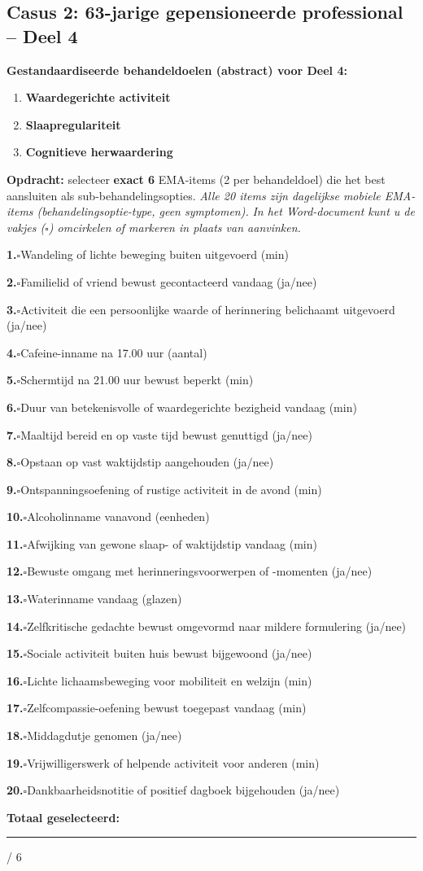 \documentclass[11pt,a4paper]{article}
\newcommand{\checkitemBFS}[2]{%
\noindent\small\textbf{#1.}\hspace{0.45em}$\square$\hspace{0.4em}#2\par\vspace{0.20em}}
\begin{document}
\vspace{0.6em}
\newpage
\subsection*{Casus 2: 63-jarige gepensioneerde professional -- Deel 4}

\begin{contextbox}
\small\textbf{Gestandaardiseerde behandeldoelen (abstract) voor Deel 4:}
\begin{enumerate}[topsep=2pt,itemsep=1pt,label=\arabic*.]
\item \textbf{Waardegerichte activiteit}
\item \textbf{Slaapregulariteit}
\item \textbf{Cognitieve herwaardering}
\end{enumerate}
\end{contextbox}

\begin{responsebox}
\small\textbf{Opdracht:} selecteer \textbf{exact 6} EMA-items (2 per behandeldoel) die het best aansluiten als sub-behandelingsopties.
\textit{Alle 20 items zijn dagelijkse mobiele EMA-items (behandelingsoptie-type, geen symptomen).}
\textit{In het Word-document kunt u de vakjes ($\square$) omcirkelen of markeren in plaats van aanvinken.}

\checkitemBFS{1}{Wandeling of lichte beweging buiten uitgevoerd (min)}
\checkitemBFS{2}{Familielid of vriend bewust gecontacteerd vandaag (ja/nee)}
\checkitemBFS{3}{Activiteit die een persoonlijke waarde of herinnering belichaamt uitgevoerd (ja/nee)}
\checkitemBFS{4}{Cafeine-inname na 17.00 uur (aantal)}
\checkitemBFS{5}{Schermtijd na 21.00 uur bewust beperkt (min)}
\checkitemBFS{6}{Duur van betekenisvolle of waardegerichte bezigheid vandaag (min)}
\checkitemBFS{7}{Maaltijd bereid en op vaste tijd bewust genuttigd (ja/nee)}
\checkitemBFS{8}{Opstaan op vast waktijdstip aangehouden (ja/nee)}
\checkitemBFS{9}{Ontspanningsoefening of rustige activiteit in de avond (min)}
\checkitemBFS{10}{Alcoholinname vanavond (eenheden)}
\checkitemBFS{11}{Afwijking van gewone slaap- of waktijdstip vandaag (min)}
\checkitemBFS{12}{Bewuste omgang met herinneringsvoorwerpen of -momenten (ja/nee)}
\checkitemBFS{13}{Waterinname vandaag (glazen)}
\checkitemBFS{14}{Zelfkritische gedachte bewust omgevormd naar mildere formulering (ja/nee)}
\checkitemBFS{15}{Sociale activiteit buiten huis bewust bijgewoond (ja/nee)}
\checkitemBFS{16}{Lichte lichaamsbeweging voor mobiliteit en welzijn (min)}
\checkitemBFS{17}{Zelfcompassie-oefening bewust toegepast vandaag (min)}
\checkitemBFS{18}{Middagdutje genomen (ja/nee)}
\checkitemBFS{19}{Vrijwilligerswerk of helpende activiteit voor anderen (min)}
\checkitemBFS{20}{Dankbaarheidsnotitie of positief dagboek bijgehouden (ja/nee)}
\vspace{0.4em}
\noindent\textbf{Totaal geselecteerd:}\hspace{0.5em}\rule{1.2cm}{0.25pt}\hspace{0.2em}/ 6
\end{responsebox}
\end{document}
